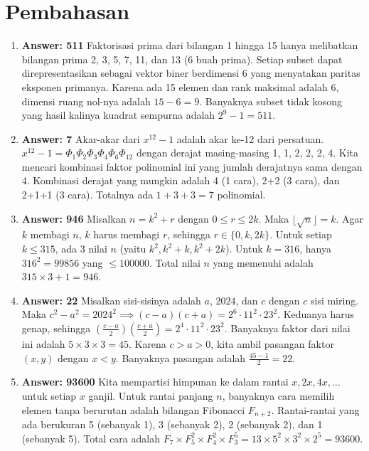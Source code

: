 \documentclass[12pt]{scrartcl}
\begin{document}
\section*{Pembahasan}

\begin{enumerate}

\item \textbf{Answer: 511} Faktorisasi prima dari bilangan 1 hingga 15 hanya melibatkan bilangan prima 2, 3, 5, 7, 11, dan 13 (6 buah prima). Setiap subset dapat direpresentasikan sebagai vektor biner berdimensi 6 yang menyatakan paritas eksponen primanya. Karena ada 15 elemen dan rank maksimal adalah 6, dimensi ruang nol-nya adalah $15 - 6 = 9$. Banyaknya subset tidak kosong yang hasil kalinya kuadrat sempurna adalah $2^9 - 1 = 511$.

\item  \textbf{Answer: 7} Akar-akar dari $x^{12}-1$ adalah akar ke-12 dari persatuan. $x^{12}-1 = \Phi_1 \Phi_2 \Phi_3 \Phi_4 \Phi_6 \Phi_{12}$ dengan derajat masing-masing 1, 1, 2, 2, 2, 4. Kita mencari kombinasi faktor polinomial ini yang jumlah derajatnya sama dengan 4. Kombinasi derajat yang mungkin adalah 4 (1 cara), 2+2 (3 cara), dan 2+1+1 (3 cara). Totalnya ada $1 + 3 + 3 = 7$ polinomial.

\item  \textbf{Answer: 946} Misalkan $n = k^2 + r$ dengan $0 \le r \le 2k$. Maka $\lfloor \sqrt{n} \rfloor = k$. Agar $k$ membagi $n$, $k$ harus membagi $r$, sehingga $r \in \{0, k, 2k\}$. Untuk setiap $k \le 315$, ada 3 nilai $n$ (yaitu $k^2, k^2+k, k^2+2k$). Untuk $k = 316$, hanya $316^2 = 99856$ yang $\le 100000$. Total nilai $n$ yang memenuhi adalah $315 \times 3 + 1 = 946$.

\item  \textbf{Answer: 22} Misalkan sisi-sisinya adalah $a$, $2024$, dan $c$ dengan $c$ sisi miring. Maka $c^2 - a^2 = 2024^2 \implies (c-a)(c+a) = 2^6 \cdot 11^2 \cdot 23^2$. Keduanya harus genap, sehingga $\left(\frac{c-a}{2}\right)\left(\frac{c+a}{2}\right) = 2^4 \cdot 11^2 \cdot 23^2$. Banyaknya faktor dari nilai ini adalah $5 \times 3 \times 3 = 45$. Karena $c > a > 0$, kita ambil pasangan faktor $(x, y)$ dengan $x < y$. Banyaknya pasangan adalah $\frac{45 - 1}{2} = 22$.

\item  \textbf{Answer: 93600} Kita mempartisi himpunan ke dalam rantai $x, 2x, 4x, \dots$ untuk setiap $x$ ganjil. Untuk rantai panjang $n$, banyaknya cara memilih elemen tanpa berurutan adalah bilangan Fibonacci $F_{n+2}$. Rantai-rantai yang ada berukuran 5 (sebanyak 1), 3 (sebanyak 2), 2 (sebanyak 2), dan 1 (sebanyak 5). Total cara adalah $F_7 \times F_5^2 \times F_4^2 \times F_3^5 = 13 \times 5^2 \times 3^2 \times 2^5 = 93600$.


\end{enumerate}
\end{document}
